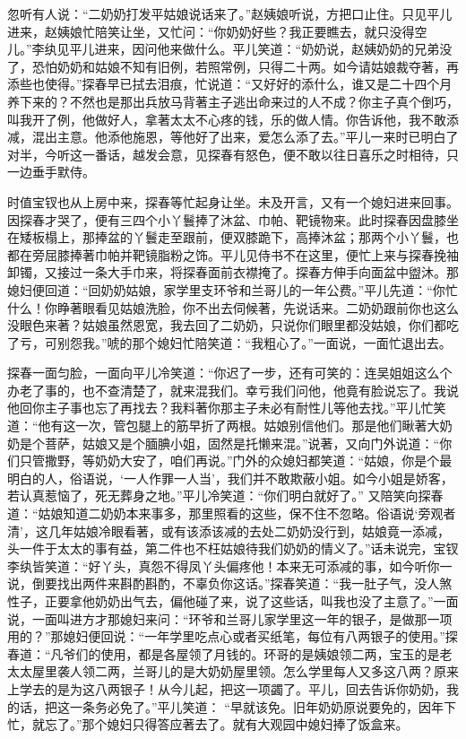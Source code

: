 \begin{parag}
    忽听有人说：“二奶奶打发平姑娘说话来了。”赵姨娘听说，方把口止住。只见平儿进来，赵姨娘忙陪笑让坐，又忙问：“你奶奶好些？我正要瞧去，就只没得空儿。”李纨见平儿进来，因问他来做什么。平儿笑道：“奶奶说，赵姨奶奶的兄弟没了，恐怕奶奶和姑娘不知有旧例，若照常例，只得二十两。如今请姑娘裁夺著，再添些也使得。”探春早已拭去泪痕，忙说道：“又好好的添什么，谁又是二十四个月养下来的？不然也是那出兵放马背著主子逃出命来过的人不成？你主子真个倒巧，叫我开了例，他做好人，拿著太太不心疼的钱，乐的做人情。你告诉他，我不敢添减，混出主意。他添他施恩，等他好了出来，爱怎么添了去。”平儿一来时已明白了对半，今听这一番话，越发会意，见探春有怒色，便不敢以往日喜乐之时相待，只一边垂手默侍。
\end{parag}


\begin{parag}
    时值宝钗也从上房中来，探春等忙起身让坐。未及开言，又有一个媳妇进来回事。因探春才哭了，便有三四个小丫鬟捧了沐盆、巾帕、靶镜物来。此时探春因盘膝坐在矮板榻上，那捧盆的丫鬟走至跟前，便双膝跪下，高捧沐盆；那两个小丫鬟，也都在旁屈膝捧著巾帕并靶镜脂粉之饰。平儿见侍书不在这里，便忙上来与探春挽袖卸镯，又接过一条大手巾来，将探春面前衣襟掩了。探春方伸手向面盆中盥沐。那媳妇便回道：“回奶奶姑娘，家学里支环爷和兰哥儿的一年公费。”平儿先道：“你忙什么！你睁著眼看见姑娘洗脸，你不出去伺候著，先说话来。二奶奶跟前你也这么没眼色来著？姑娘虽然恩宽，我去回了二奶奶，只说你们眼里都没姑娘，你们都吃了亏，可别怨我。”唬的那个媳妇忙陪笑道：“我粗心了。”一面说，一面忙退出去。
\end{parag}


\begin{parag}
    探春一面匀脸，一面向平儿冷笑道：“你迟了一步，还有可笑的：连吴姐姐这么个办老了事的，也不查清楚了，就来混我们。幸亏我们问他，他竟有脸说忘了。我说他回你主子事也忘了再找去？我料著你那主子未必有耐性儿等他去找。”平儿忙笑道：“他有这一次，管包腿上的筋早折了两根。姑娘别信他们。那是他们瞅著大奶奶是个菩萨，姑娘又是个腼腆小姐，固然是托懒来混。”说著，又向门外说道：“你们只管撒野，等奶奶大安了，咱们再说。”门外的众媳妇都笑道：“姑娘，你是个最明白的人，俗语说，‘一人作罪一人当’，我们并不敢欺蔽小姐。如今小姐是娇客，若认真惹恼了，死无葬身之地。”平儿冷笑道：“你们明白就好了。” 又陪笑向探春道：“姑娘知道二奶奶本来事多，那里照看的这些，保不住不忽略。俗语说‘旁观者清’，这几年姑娘冷眼看著，或有该添该减的去处二奶奶没行到，姑娘竟一添减，头一件于太太的事有益，第二件也不枉姑娘待我们奶奶的情义了。”话未说完，宝钗李纨皆笑道：“好丫头，真怨不得凤丫头偏疼他！本来无可添减的事，如今听你一说，倒要找出两件来斟酌斟酌，不辜负你这话。”探春笑道：“我一肚子气，没人煞性子，正要拿他奶奶出气去，偏他碰了来，说了这些话，叫我也没了主意了。”一面说，一面叫进方才那媳妇来问：“环爷和兰哥儿家学里这一年的银子，是做那一项用的？”那媳妇便回说：“一年学里吃点心或者买纸笔，每位有八两银子的使用。”探春道：“凡爷们的使用，都是各屋领了月钱的。环哥的是姨娘领二两，宝玉的是老太太屋里袭人领二两，兰哥儿的是大奶奶屋里领。怎么学里每人又多这八两？原来上学去的是为这八两银子！从今儿起，把这一项蠲了。平儿，回去告诉你奶奶，我的话，把这一条务必免了。”平儿笑道： “早就该免。旧年奶奶原说要免的，因年下忙，就忘了。”那个媳妇只得答应著去了。就有大观园中媳妇捧了饭盒来。
\end{parag}


